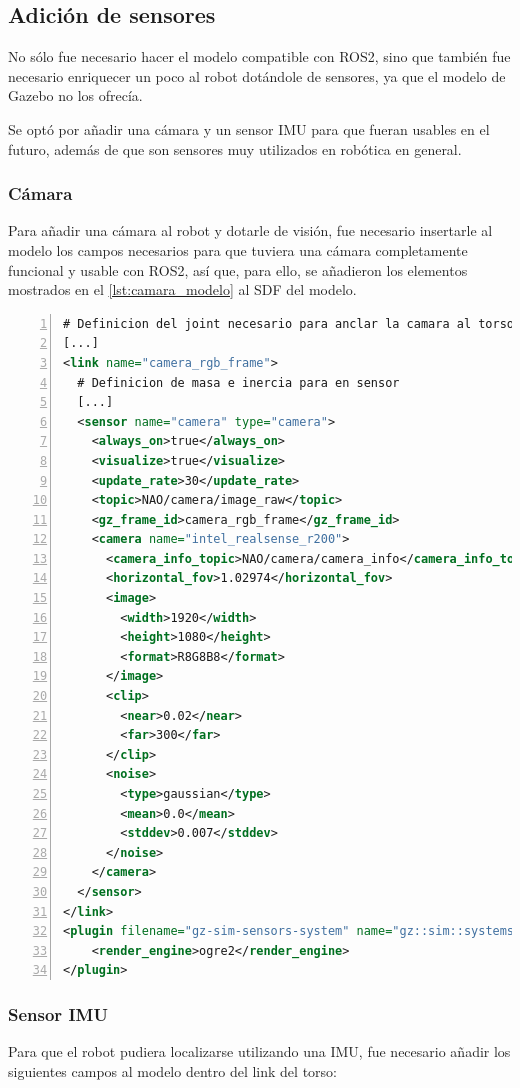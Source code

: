 \subsection{Adición de sensores}

No sólo fue necesario hacer el modelo compatible con ROS2, sino que también fue  necesario
enriquecer un poco al robot dotándole de sensores, ya que el modelo de Gazebo no los ofrecía. 

Se optó por añadir una cámara y un sensor IMU para que fueran usables en el futuro, además de que son sensores muy utilizados en robótica en general.

\subsubsection{Cámara}
Para añadir una cámara al robot y dotarle de visión, fue necesario insertarle al modelo los campos necesarios para que tuviera una cámara completamente funcional y usable con ROS2, así que, para ello, se añadieron los elementos mostrados en el \autoref{lst:camara_modelo} al SDF del modelo.

\begin{lstlisting}[language=XML, caption={Adición de la cámara al modelo}, label={lst:camara_modelo}, numbers=left, backgroundcolor=\color{gray!10}]   
# Definicion del joint necesario para anclar la camara al torso del robot
[...]
<link name="camera_rgb_frame">
  # Definicion de masa e inercia para en sensor
  [...]
  <sensor name="camera" type="camera">
    <always_on>true</always_on>
    <visualize>true</visualize>
    <update_rate>30</update_rate>
    <topic>NAO/camera/image_raw</topic>
    <gz_frame_id>camera_rgb_frame</gz_frame_id>
    <camera name="intel_realsense_r200">
      <camera_info_topic>NAO/camera/camera_info</camera_info_topic>
      <horizontal_fov>1.02974</horizontal_fov>
      <image>
        <width>1920</width>
        <height>1080</height>
        <format>R8G8B8</format>
      </image>
      <clip>
        <near>0.02</near>
        <far>300</far>
      </clip>
      <noise>
        <type>gaussian</type>
        <mean>0.0</mean>
        <stddev>0.007</stddev>
      </noise>
    </camera> 
  </sensor>
</link>
<plugin filename="gz-sim-sensors-system" name="gz::sim::systems::Sensors">
    <render_engine>ogre2</render_engine>
</plugin>
\end{lstlisting}

\subsubsection{Sensor IMU}
Para que el robot pudiera localizarse utilizando una IMU, fue necesario añadir los siguientes campos al modelo dentro del link del torso:

